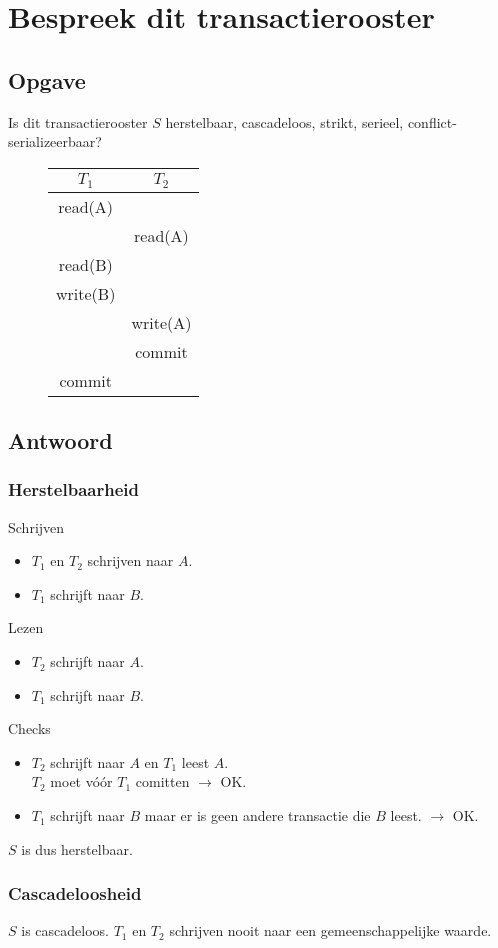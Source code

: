 \documentclass[transacties.tex]{subfiles}
\begin{document}
\section{Bespreek dit transactierooster}
\subsection*{Opgave}
Is dit transactierooster $S$ herstelbaar, cascadeloos, strikt, serieel, conflict-serializeerbaar?
\begin{figure}[H]
\centering
\begin{tabular}{c|c}
$T_1$&$T_2$\\
\hline
read(A) &\\
& read(A)\\
read(B)&\\
write(B)&\\
&write(A)\\
&commit\\
commit&
\end{tabular}
\end{figure}
\subsection*{Antwoord}
\subsubsection*{Herstelbaarheid}
Schrijven
\begin{itemize}
\item $T_1$ en $T_2$ schrijven naar $A$.
\item $T_1$ schrijft naar $B$.
\end{itemize}
Lezen
\begin{itemize}
\item $T_2$ schrijft naar $A$.
\item $T_1$ schrijft naar $B$.
\end{itemize}
Checks
\begin{itemize}
\item $T_2$ schrijft naar $A$ en $T_1$ leest $A$.\\
$T_2$ moet v\'o\'or $T_1$ comitten $\rightarrow$ OK.
\item $T_1$ schrijft naar $B$ maar er is geen andere transactie die $B$ leest. $\rightarrow$ OK.
\end{itemize}
$S$ is dus herstelbaar.
\subsubsection*{Cascadeloosheid}
$S$ is cascadeloos. $T_1$ en $T_2$ schrijven nooit naar een gemeenschappelijke waarde.
\end{document}
